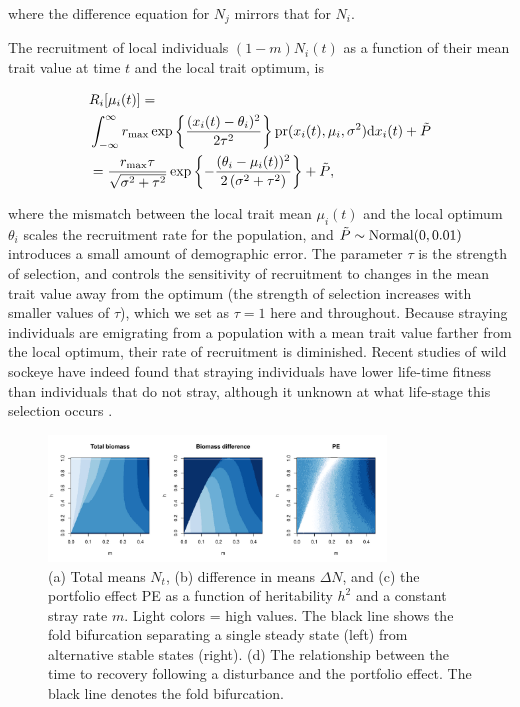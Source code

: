 \documentclass[twocolumn,preprintnumbers,amsmath,amssymb,superscriptaddress]{revtex4}
\begin{document}
\noindent where the difference equation for $N_j$ mirrors that for $N_i$.

The recruitment of local individuals $(1-m)N_i(t)$ as a function of their mean trait value at time $t$ and the local trait optimum, is

\begin{align}
  &R_i[\mu_i(t)] = \\ \nonumber
  &\int_{-\infty}^\infty r_{\rm max}\exp\left\{\frac{(x_i(t)-\theta_i)^2}{2\tau^2}\right\} {\rm pr}(x_i(t),\mu_i,\sigma^2) {\rm d}x_i(t) +\tilde{P}\\ \nonumber
  &= \frac{r_{\rm max} \tau  }{\sqrt{\sigma ^2+\tau ^2}}\exp\left\{-\frac{(\theta_i-\mu_i(t))^2}{2 \left(\sigma ^2+\tau ^2\right)}\right\} +\tilde{P},
  \label{eq:R}
\end{align}

\noindent where the mismatch between the local trait mean $\mu_i(t)$ and the local optimum $\theta_i$ scales the recruitment rate for the population, and $\tilde{P}\sim {\rm Normal}(0,0.01)$ introduces a small amount of demographic error.
The parameter $\tau$ is the strength of selection, and controls the sensitivity of recruitment to changes in the mean trait value away from the optimum (the strength of selection increases with smaller values of $\tau$), which we set as $\tau=1$ here and throughout.
Because straying individuals are emigrating from a population with a mean trait value farther from the local optimum, their rate of recruitment is diminished.
Recent studies of wild sockeye have indeed found that straying individuals have lower life-time fitness than individuals that do not stray, although it unknown at what life-stage this selection occurs \cite{Peterson:2014gy}.
\\

\begin{figure}
  \captionsetup{justification=raggedright,
singlelinecheck=false
}
\centering
\includegraphics[width=0.8\textwidth]{figs2/fig_MDPE_hm.pdf}
\caption{
(a) Total means $N_t$, (b) difference in means $\Delta N$, and (c) the portfolio effect PE as a function of heritability $h^2$ and a constant stray rate $m$. Light colors = high values.
The black line shows the fold bifurcation separating a single steady state (left) from alternative stable states (right).
(d) The relationship between the time to recovery following a disturbance and the portfolio effect.
The black line denotes the fold bifurcation.
} \label{fig:PE}
\end{figure}
\end{document}
